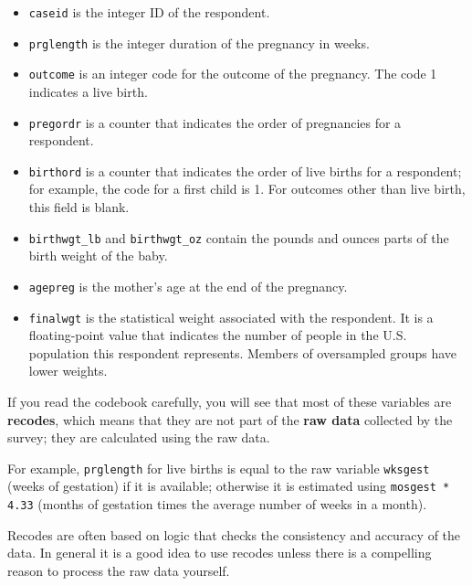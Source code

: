 \documentclass[12pt]{book}
\begin{document}
\begin{itemize}

\item {\tt caseid} is the integer ID of the respondent.

\item {\tt prglength} is the integer duration of the pregnancy in weeks.

\item {\tt outcome} is an integer code for the outcome of the
  pregnancy.  The code 1 indicates a live birth.

\item {\tt pregordr} is a counter that indicates the order of
pregnancies for a respondent.

\item {\tt birthord} is a counter that indicates the order of live
  births for a respondent; for example, the code for a first child is
  1.  For outcomes other than live birth, this field is blank.

\item \verb"birthwgt_lb" and \verb"birthwgt_oz" contain the pounds and
  ounces parts of the birth weight of the baby.

\item {\tt agepreg} is the mother's age at the end of the pregnancy.

\item {\tt finalwgt} is the statistical weight associated with the
  respondent.  It is a floating-point value that indicates the number
  of people in the U.S. population this respondent represents.
  Members of oversampled groups have lower
  weights.

\end{itemize}

If you read the codebook carefully, you will see that most of these
variables are {\bf recodes}, which means that they are not part of the
{\bf raw data} collected by the survey; they are calculated using
the raw data.   

For example, {\tt prglength} for live births is equal to the raw
variable {\tt wksgest} (weeks of gestation) if it is available;
otherwise it is estimated using {\tt mosgest * 4.33} (months of
gestation times the average number of weeks in a month).

Recodes are often based on logic that checks the consistency and
accuracy of the data.  In general it is a good idea to use recodes
unless there is a compelling reason to process the raw data
yourself.
\end{document}
